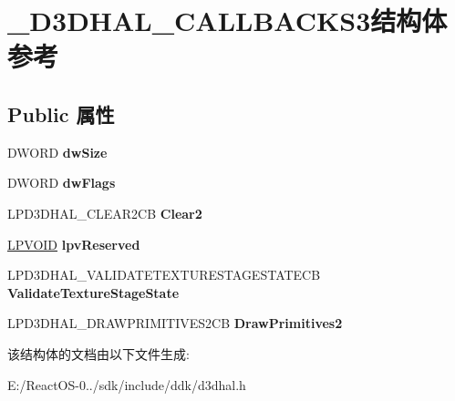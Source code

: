 \hypertarget{struct___d3_d_h_a_l___c_a_l_l_b_a_c_k_s3}{}\section{\+\_\+\+D3\+D\+H\+A\+L\+\_\+\+C\+A\+L\+L\+B\+A\+C\+K\+S3结构体 参考}
\label{struct___d3_d_h_a_l___c_a_l_l_b_a_c_k_s3}
\subsection*{Public 属性}
\begin{DoxyCompactItemize}
\item 
\mbox{\label{struct___d3_d_h_a_l___c_a_l_l_b_a_c_k_s3_a45baff500ca691a2b8c7b1040f780187}} 
D\+W\+O\+RD {\bfseries dw\+Size}
\item 
\mbox{\label{struct___d3_d_h_a_l___c_a_l_l_b_a_c_k_s3_af107d44dc54eb651965210091de1346f}} 
D\+W\+O\+RD {\bfseries dw\+Flags}
\item 
\mbox{\label{struct___d3_d_h_a_l___c_a_l_l_b_a_c_k_s3_acfa832d378f00a22b1c78035c5b02b34}} 
L\+P\+D3\+D\+H\+A\+L\+\_\+\+C\+L\+E\+A\+R2\+CB {\bfseries Clear2}
\item 
\mbox{\label{struct___d3_d_h_a_l___c_a_l_l_b_a_c_k_s3_ad899b40dddafafb8e653dd62c0b55e9d}} 
\hyperlink{interfacevoid}{L\+P\+V\+O\+ID} {\bfseries lpv\+Reserved}
\item 
\mbox{\label{struct___d3_d_h_a_l___c_a_l_l_b_a_c_k_s3_ad70b07fe1bd07c18069e0f5face25ff5}} 
L\+P\+D3\+D\+H\+A\+L\+\_\+\+V\+A\+L\+I\+D\+A\+T\+E\+T\+E\+X\+T\+U\+R\+E\+S\+T\+A\+G\+E\+S\+T\+A\+T\+E\+CB {\bfseries Validate\+Texture\+Stage\+State}
\item 
\mbox{\label{struct___d3_d_h_a_l___c_a_l_l_b_a_c_k_s3_a0446bc9f652cb95f6ff34ffd44c07cfd}} 
L\+P\+D3\+D\+H\+A\+L\+\_\+\+D\+R\+A\+W\+P\+R\+I\+M\+I\+T\+I\+V\+E\+S2\+CB {\bfseries Draw\+Primitives2}
\end{DoxyCompactItemize}


该结构体的文档由以下文件生成\+:\begin{DoxyCompactItemize}
\item 
E\+:/\+React\+O\+S-\/0../sdk/include/ddk/d3dhal.\+h\end{DoxyCompactItemize}
